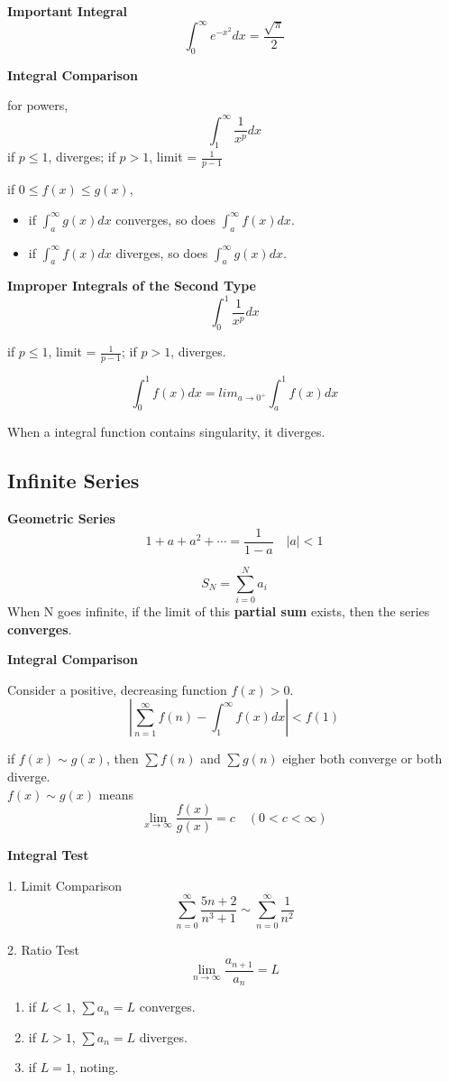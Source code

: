 \documentclass{article}
\newcommand\limitx[1]{\lim_{x \to #1}}
\newcommand\improperint[1]{\int_{#1}^\infty}
\begin{document}
\textbf{Important Integral}
$$\improperint{0}e^{-x^2}dx = \frac{\sqrt{\pi}}{2}$$

\textbf{Integral Comparison}

for powers,
$$\improperint{1}\frac{1}{x^p}dx$$
if $p \le 1$, diverges; if $p > 1$, limit = $\frac{1}{p-1}$

if $0 \le f(x) \le g(x)$,
\begin{itemize}
  \item if $\improperint{a}g(x)dx$ converges, so does $\improperint{a}f(x)dx$.
  \item if $\improperint{a}f(x)dx$ diverges, so does $\improperint{a}g(x)dx$.
\end{itemize}

\textbf{Improper Integrals of the Second Type}
$$\int_0^1\frac{1}{x^p}dx$$

if $p \le 1$, limit = $\frac{1}{p-1}$; if $p > 1$, diverges.

$$\int_0^1f(x)dx = lim_{a \rightarrow 0^+}\int_a^1f(x)dx$$

When a integral function contains singularity, it diverges.

\subsection{Infinite Series}
\textbf{Geometric Series}
$$1 + a + a^2 + \cdots = \frac{1}{1-a} \quad |a| < 1$$

$$S_N = \sum\limits_{i=0}^{N}a_i$$
When N goes infinite, if the limit of this \textbf{partial sum} exists, then the series \textbf{converges}.

\textbf{Integral Comparison}

Consider a positive, decreasing function $f(x) > 0$.
$$|\sum\limits_{n=1}^{\infty}f(n) - \improperint{1}f(x)dx| < f(1)$$

if $f(x) \sim g(x)$, then $\sum f(n)$ and $\sum g(n)$ eigher both converge or both diverge. \\
$f(x) \sim g(x)$ means
$$\limitx{\infty}\frac{f(x)}{g(x)} = c \quad (0 < c < \infty)$$

\textbf{Integral Test}

1. Limit Comparison
$$\sum\limits_{n=0}^{\infty}\frac{5n+2}{n^3+1} \sim \sum\limits_{n=0}^{\infty}\frac{1}{n^2}$$

2. Ratio Test
$$\lim_{n \rightarrow \infty}\frac{a_{n+1}}{a_{n}} = L$$
\begin{enumerate}
  \item if $L < 1$, $\sum a_n = L$ converges.
  \item if $L >1 $, $\sum a_n = L$ diverges.
  \item if $L = 1$, noting.
\end{enumerate}
\end{document}
